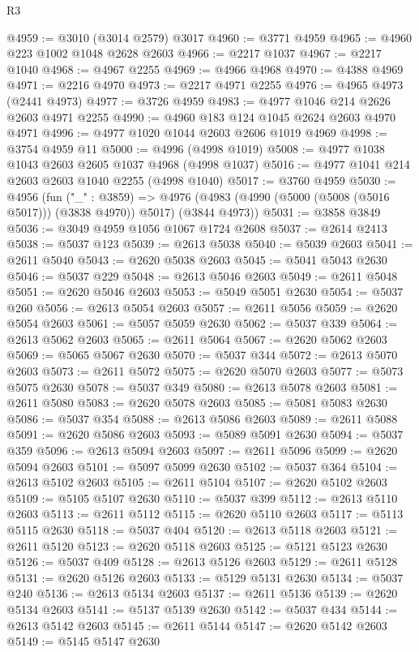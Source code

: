\begin{lexlean}{R3}
\begin{coremodule}
@4959 := @3010 (@3014 @2579) @3017
@4960 := @3771 @4959
@4965 := @4960 @223 @1002 @1048 @2628 @2603
@4966 := @2217 @1037
@4967 := @2217 @1040
@4968 := @4967 @2255
@4969 := @4966 @4968
@4970 := @4388 @4969
@4971 := @2216 @4970
@4973 := @2217 @4971 @2255
@4976 := @4965 @4973 (@2441 @4973)
@4977 := @3726 @4959
@4983 := @4977 @1046 @214 @2626 @2603 @4971 @2255
@4990 := @4960 @183 @124 @1045 @2624 @2603 @4970 @4971
@4996 := @4977 @1020 @1044 @2603 @2606 @1019 @4969
@4998 := @3754 @4959 @11
@5000 := @4996 (@4998 @1019)
@5008 := @4977 @1038 @1043 @2603 @2605 @1037 @4968 (@4998 @1037)
@5016 := @4977 @1041 @214 @2603 @2603 @1040 @2255 (@4998 @1040)
@5017 := @3760 @4959
@5030 := @4956
    (fun ("_" : @3859) =>
    @4976 (@4983 (@4990 (@5000 (@5008 (@5016 @5017))) (@3838 @4970)) @5017) (@3844 @4973))
@5031 := @3858 @3849
@5036 := @3049 @4959 @1056 @1067 @1724 @2608
@5037 := @2614 @2413
@5038 := @5037 @123
@5039 := @2613 @5038
@5040 := @5039 @2603
@5041 := @2611 @5040
@5043 := @2620 @5038 @2603
@5045 := @5041 @5043 @2630
@5046 := @5037 @229
@5048 := @2613 @5046 @2603
@5049 := @2611 @5048
@5051 := @2620 @5046 @2603
@5053 := @5049 @5051 @2630
@5054 := @5037 @260
@5056 := @2613 @5054 @2603
@5057 := @2611 @5056
@5059 := @2620 @5054 @2603
@5061 := @5057 @5059 @2630
@5062 := @5037 @339
@5064 := @2613 @5062 @2603
@5065 := @2611 @5064
@5067 := @2620 @5062 @2603
@5069 := @5065 @5067 @2630
@5070 := @5037 @344
@5072 := @2613 @5070 @2603
@5073 := @2611 @5072
@5075 := @2620 @5070 @2603
@5077 := @5073 @5075 @2630
@5078 := @5037 @349
@5080 := @2613 @5078 @2603
@5081 := @2611 @5080
@5083 := @2620 @5078 @2603
@5085 := @5081 @5083 @2630
@5086 := @5037 @354
@5088 := @2613 @5086 @2603
@5089 := @2611 @5088
@5091 := @2620 @5086 @2603
@5093 := @5089 @5091 @2630
@5094 := @5037 @359
@5096 := @2613 @5094 @2603
@5097 := @2611 @5096
@5099 := @2620 @5094 @2603
@5101 := @5097 @5099 @2630
@5102 := @5037 @364
@5104 := @2613 @5102 @2603
@5105 := @2611 @5104
@5107 := @2620 @5102 @2603
@5109 := @5105 @5107 @2630
@5110 := @5037 @399
@5112 := @2613 @5110 @2603
@5113 := @2611 @5112
@5115 := @2620 @5110 @2603
@5117 := @5113 @5115 @2630
@5118 := @5037 @404
@5120 := @2613 @5118 @2603
@5121 := @2611 @5120
@5123 := @2620 @5118 @2603
@5125 := @5121 @5123 @2630
@5126 := @5037 @409
@5128 := @2613 @5126 @2603
@5129 := @2611 @5128
@5131 := @2620 @5126 @2603
@5133 := @5129 @5131 @2630
@5134 := @5037 @240
@5136 := @2613 @5134 @2603
@5137 := @2611 @5136
@5139 := @2620 @5134 @2603
@5141 := @5137 @5139 @2630
@5142 := @5037 @434
@5144 := @2613 @5142 @2603
@5145 := @2611 @5144
@5147 := @2620 @5142 @2603
@5149 := @5145 @5147 @2630

\end{coremodule}
\end{lexlean}
